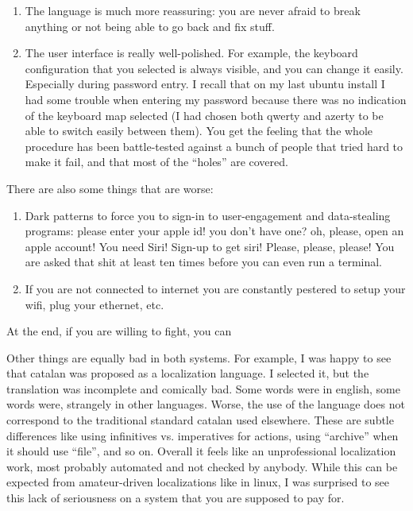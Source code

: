 \begin{enumerate}
	\item The language is much more reassuring: you are never afraid to
		break anything or not being able to go back and fix stuff.
	\item The user interface is really well-polished.  For example, the
		keyboard configuration that you selected is always visible,
		and you can change it easily.  Especially during password
		entry.  I recall that on my last ubuntu install I had some
		trouble when entering my password because there was no
		indication of the keyboard map selected (I had chosen both
		qwerty and azerty to be able to switch easily between them).
		You get the feeling that the whole procedure has been
		battle-tested against a bunch of people that tried hard to
		make it fail, and that most of the ``holes'' are covered.
\end{enumerate}


There are also some things that are worse:

\begin{enumerate}
	\item Dark patterns to force you to sign-in to user-engagement and
		data-stealing programs: please enter your apple id! you don't
		have one? oh, please, open an apple account!  You need Siri!
		Sign-up to get siri!  Please, please, please!  You are asked
		that shit at least ten times before you can even run a
		terminal.
	\item If you are not connected to internet you are constantly
		pestered to setup your wifi, plug your ethernet, etc.
\end{enumerate}

At the end, if you are willing to fight, you can 

Other things are equally bad in both systems.  For example, I was happy to
see that catalan was proposed as a localization language.  I selected it, but
the translation was incomplete and comically bad.  Some words were in
english, some words were, strangely in other languages.  Worse, the use of
the language does not correspond to the traditional standard catalan used
elsewhere.  These are subtle differences like using infinitives vs.
imperatives for actions, using ``archive'' when it should use ``file'', and
so on.  Overall it feels like an unprofessional localization work, most
probably automated and not checked by anybody.  While this can be expected
from amateur-driven localizations like in linux, I was surprised to see this
lack of seriousness on a system that you are supposed to pay for.

